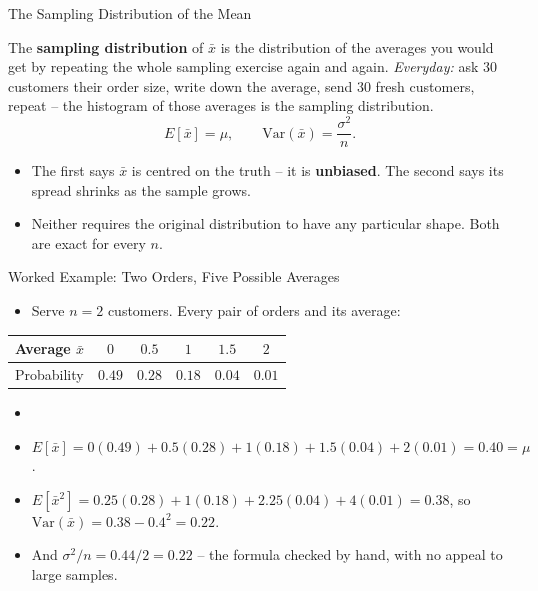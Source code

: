 \begin{frame}{The Sampling Distribution of the Mean}
\begin{rldefinition}
The \textbf{sampling distribution} of $\bar{x}$ is the distribution of the averages you would get by repeating the whole sampling exercise again and again. \emph{Everyday:} ask $30$ customers their order size, write down the average, send $30$ fresh customers, repeat -- the histogram of those averages is the sampling distribution.
\[
E[\bar{x}] = \mu, \qquad \mathrm{Var}(\bar{x}) = \frac{\sigma^2}{n} .
\]
\end{rldefinition}
\pause
\begin{itemize}
  \item The first says $\bar{x}$ is centred on the truth -- it is \textbf{unbiased}. The second says its spread shrinks as the sample grows.
  \pause
  \item Neither requires the original distribution to have any particular shape. Both are exact for every $n$.
\end{itemize}
\end{frame}

\begin{frame}{Worked Example: Two Orders, Five Possible Averages}
\begin{itemize}
  \item Serve $n = 2$ customers. Every pair of orders and its average:
\end{itemize}
\centering
\small
\begin{tabular}{l|ccccc}
Average $\bar{x}$    & $0$    & $0.5$  & $1$    & $1.5$  & $2$    \\
\hline
Probability          & $0.49$ & $0.28$ & $0.18$ & $0.04$ & $0.01$ \\
\end{tabular}

\vspace{0.4em}
\raggedright
\begin{itemize}
  \item[] \pause
  \item $E[\bar{x}] = 0(0.49) + 0.5(0.28) + 1(0.18) + 1.5(0.04) + 2(0.01) = 0.40 = \mu$. \pause
  \item $E[\bar{x}^2] = 0.25(0.28) + 1(0.18) + 2.25(0.04) + 4(0.01) = 0.38$, so $\mathrm{Var}(\bar{x}) = 0.38 - 0.4^2 = 0.22$. \pause
  \item And $\sigma^2/n = 0.44/2 = 0.22$ -- the formula checked by hand, with no appeal to large samples.
\end{itemize}
\end{frame}

